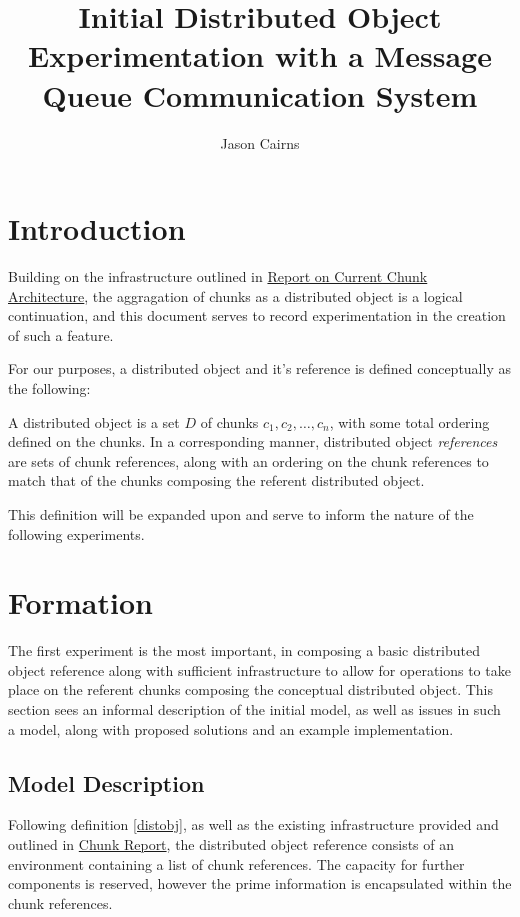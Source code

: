 \documentclass[a4paper,10pt]{article}
\begin{document}
\title{Initial Distributed Object Experimentation with a Message Queue Communication System}
\author{Jason Cairns}
  
\maketitle{}

\section{Introduction}

Building on the infrastructure outlined in \href{chunk-report.pdf}{Report on
Current Chunk Architecture}, the aggragation of chunks as a distributed object
is a logical continuation, and this document serves to record experimentation
in the creation of such a feature.

For our purposes, a distributed object and it's reference is defined
conceptually as the following:

\begin{definition}
	\label{distobj}
	A distributed object is a set \(D\) of chunks \(c_1, c_2, \dots, c_n\),
	with some total ordering defined on the chunks. 
	In a corresponding manner, distributed object \textit{references} are
	sets of chunk references, along with an ordering on the chunk
	references to match that of the chunks composing the referent
	distributed object.
\end{definition}

This definition will be expanded upon and serve to inform the nature of the
following experiments.

\section{Formation}

The first experiment is the most important, in composing a basic distributed
object reference along with sufficient infrastructure to allow for operations
to take place on the referent chunks composing the conceptual distributed
object.
This section sees an informal description of the initial model, as well as
issues in such a model, along with proposed solutions and an example
implementation.

\subsection{Model Description}

Following definition \ref{distobj}, as well as the existing infrastructure
provided and outlined in \href{chunk-report.pdf}{Chunk Report}, the distributed
object reference consists of an environment containing a list of chunk
references.
The capacity for further components is reserved, however the prime information
is encapsulated within the chunk references.
\end{document}
